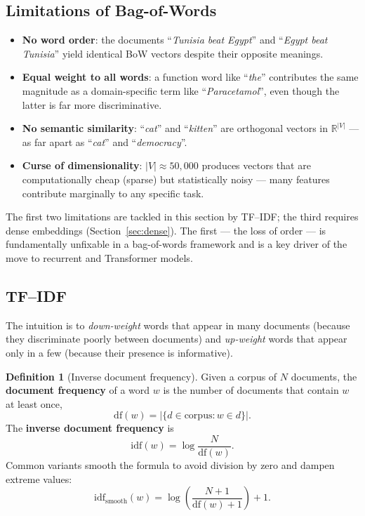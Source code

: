 \documentclass[12pt,a4paper]{report}
\theoremstyle{definition}
\newtheorem{definition}{Definition}[section]
\theoremstyle{remark}
\begin{document}
\subsection{Limitations of Bag-of-Words}

\begin{itemize}
    \item \textbf{No word order}: the documents ``\emph{Tunisia beat Egypt}'' and ``\emph{Egypt beat Tunisia}'' yield identical BoW vectors despite their opposite meanings.
    \item \textbf{Equal weight to all words}: a function word like ``\emph{the}'' contributes the same magnitude as a domain-specific term like ``\emph{Paracetamol}'', even though the latter is far more discriminative.
    \item \textbf{No semantic similarity}: ``\emph{cat}'' and ``\emph{kitten}'' are orthogonal vectors in $\mathbb{R}^{|V|}$ --- as far apart as ``\emph{cat}'' and ``\emph{democracy}''.
    \item \textbf{Curse of dimensionality}: $|V| \approx 50{,}000$ produces vectors that are computationally cheap (sparse) but statistically noisy --- many features contribute marginally to any specific task.
\end{itemize}

The first two limitations are tackled in this section by TF--IDF; the third requires dense embeddings (Section~\ref{sec:dense}). The first --- the loss of order --- is fundamentally unfixable in a bag-of-words framework and is a key driver of the move to recurrent and Transformer models.

\subsection{TF--IDF}

The intuition is to \emph{down-weight} words that appear in many documents (because they discriminate poorly between documents) and \emph{up-weight} words that appear only in a few (because their presence is informative).

\begin{definition}[Inverse document frequency]
Given a corpus of $N$ documents, the \textbf{document frequency} of a word $w$ is the number of documents that contain $w$ at least once,
\[ \mathrm{df}(w) = \big|\{ d \in \text{corpus} : w \in d \}\big|. \]
The \textbf{inverse document frequency} is
\[ \mathrm{idf}(w) = \log \frac{N}{\mathrm{df}(w)}. \]
Common variants smooth the formula to avoid division by zero and dampen extreme values:
\[ \mathrm{idf}_{\text{smooth}}(w) = \log\left(\frac{N + 1}{\mathrm{df}(w) + 1}\right) + 1. \]
\end{definition}
\end{document}
